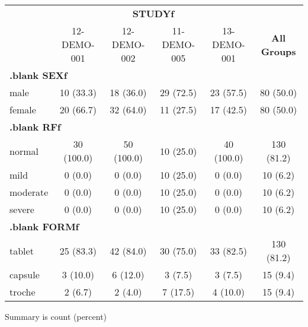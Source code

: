 {\def\arraystretch{1.4}\tabcolsep=5pt
\begin{threeparttable}
\begin{tabular}[h]{lccccc}
\hline
\multicolumn{1}{c}{} & \multicolumn{4}{c}{\textbf{STUDYf}} & \multicolumn{1}{c}{}\\
\cmidrule(lr){2-5}
\ & 12-DEMO-001 & 12-DEMO-002 & 11-DEMO-005 & 13-DEMO-001 & \textbf{All Groups} \\
\hline
\multicolumn{6}{l}{\textbf{.blank SEXf}}\\
male & 10 (33.3) & 18 (36.0) & 29 (72.5) & 23 (57.5) & 80 (50.0) \\
female & 20 (66.7) & 32 (64.0) & 11 (27.5) & 17 (42.5) & 80 (50.0) \\
\hline \multicolumn{6}{l}{\textbf{.blank RFf}}\\
normal & 30 (100.0) & 50 (100.0) & 10 (25.0) & 40 (100.0) & 130 (81.2) \\
mild & 0 (0.0) & 0 (0.0) & 10 (25.0) & 0 (0.0) & 10 (6.2) \\
moderate & 0 (0.0) & 0 (0.0) & 10 (25.0) & 0 (0.0) & 10 (6.2) \\
severe & 0 (0.0) & 0 (0.0) & 10 (25.0) & 0 (0.0) & 10 (6.2) \\
\hline \multicolumn{6}{l}{\textbf{.blank FORMf}}\\
tablet & 25 (83.3) & 42 (84.0) & 30 (75.0) & 33 (82.5) & 130 (81.2) \\
capsule & 3 (10.0) & 6 (12.0) & 3 (7.5) & 3 (7.5) & 15 (9.4) \\
troche & 2 (6.7) & 2 (4.0) & 7 (17.5) & 4 (10.0) & 15 (9.4) \\
\hline
\end{tabular}
\begin{tablenotes}[flushleft]
\item Summary is count (percent)
\end{tablenotes}
\end{threeparttable}
}
